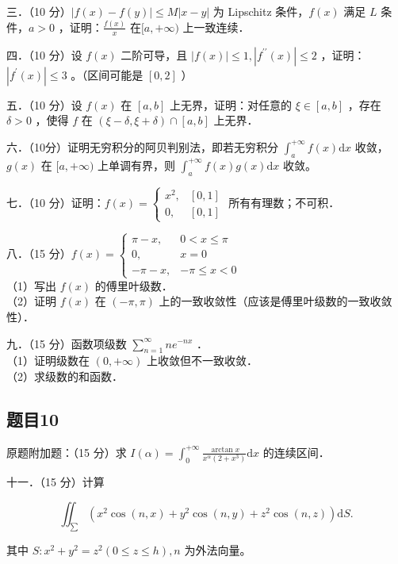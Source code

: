 \documentclass{article}
\begin{document}
三．（10 分）\(|f(x)-f(y)| \leq M|x-y|\) 为 Lipschitz 条件，\(f(x)\) 满足 \(L\) 条件，\(a>0\) ，证明：\(\frac{f(x)}{x}\) 在\([a,+\infty)\) 上一致连续．

四．（10 分）设 \(f(x)\) 二阶可导，且 \(|f(x)| \leq 1,\left|f^{\prime \prime}(x)\right| \leq 2\) ，证明：\(\left|f^{\prime}(x)\right| \leq 3\) 。（区间可能是 \([0,2]\) ）

五．（10 分）设 \(f(x)\) 在 \([a, b]\) 上无界，证明：对任意的 \(\xi \in[a, b]\) ，存在 \(\delta>0\) ，使得 \(f\) 在 \((\xi-\delta, \xi+\delta) \cap [a, b]\) 上无界．

六．（10分）证明无穷积分的阿贝判别法，即若无穷积分 \(\int_{a}^{+\infty} f(x) \mathrm{d} x\) 收敛，\(g(x)\) 在 \([a,+\infty)\) 上单调有界，则 \(\int_{a}^{+\infty} f(x) g(x) \mathrm{d} x\) 收敛。

七．（10 分）证明：\(f(x)=\left\{\begin{array}{ll}x^{2}, & {[0,1]} \\ 0, & {[0,1]}\end{array}\right.\) 所有有理数；不可积．

八．（15 分）\(f(x)= \begin{cases}\pi-x, & 0<x \leq \pi \\ 0, & x=0 \\ -\pi-x, & -\pi \leq x<0\end{cases}\)\\
（1）写出 \(f(x)\) 的傅里叶级数．\\
（2）证明 \(f(x)\) 在 \((-\pi, \pi)\) 上的一致收敛性（应该是傅里叶级数的一致收敛性）．

九．（15 分）函数项级数 \(\sum_{n=1}^{\infty} n e^{-n x}\) ．\\
（1）证明级数在 \((0,+\infty)\) 上收敛但不一致收敛．\\
（2）求级数的和函数．

\subsection{题目10}
原题附加题：（15 分）求 \(I(\alpha)=\int_{0}^{+\infty} \frac{\arctan x}{x^{\alpha}\left(2+x^{3}\right)} \mathrm{d} x\) 的连续区间．

十一．（15 分）计算

\[
\iint_{\sum}\left(x^{2} \cos (n, x)+y^{2} \cos (n, y)+z^{2} \cos (n, z)\right) \mathrm{d} S .
\]

其中 \(S: x^{2}+y^{2}=z^{2}(0 \leq z \leq h), n\) 为外法向量。
\end{document}
